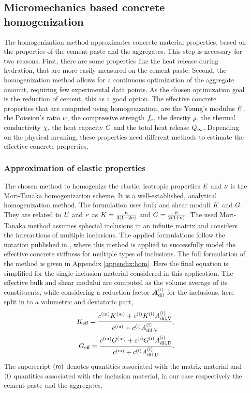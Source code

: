\subsection{Micromechanics based concrete homogenization}
The homogenization method approximates concrete material properties, based on the properties of the cement paste and the aggregates.
This step is necessary for two reasons.
First, there are some properties like the heat release during hydration, that are more easily measured on the cement paste.
Second, the homogenization method allows for a continuous optimization of the aggregate amount, requiring few experimental data points.
As the chosen optimization goal is the reduction of cement, this as a good option.
The effective concrete properties that are computed using homogenization, are the Young's modulus $E$, the Poission's ratio $\nu$, the compressive strength $f_{\text{c}}$, the density $\rho$, the thermal conductivity $\chi$, the heat capacity $C$ and the total heat release $Q_{\infty}$.
Depending on the physical meaning, these properties need different methods to estimate the effective concrete properties.
\subsubsection{Approximation of elastic properties}
The chosen method to homogenize the elastic, isotropic properties $E$ and $\nu$ is the Mori-Tanaka homogenization scheme, \cite{mor_1973_asi}
It is a well-established, analytical homogenization method.
The formulation uses bulk and shear moduli $K$ and $G$.
They are related to $E$ and $\nu$ as $K = \frac{E}{3(1-2\nu)}$ and $G = \frac{E}{2(1+\nu)}$.
The used Mori-Tanaka method assumes sphecial inclusions in an infinite matrix and considers the interactions of multiple inclusions.
The applied formulations follow the notation published in 
\cite{nee_2012_ammf}, where this method is applied to successfully model the effective concrete stiffness for multiple types of inclusions.
The full formulation of the method is given in Appendix \ref{appendix:hom}.
Here the final equation is simplified for the single inclusion material considered in this application.
The effective bulk and shear modului are computed as the volume average of its constituents,  
while considering a reduction factor $\boldsymbol{A}_{\text{dil}}^{(\text{i})}$ for the inclusions, here split in to a volumetric and deviatoric part,
\begin{align}
K_{\text{eff}} = \dfrac{c^{(\text{m})}K^{(\text{m})} + c^{(\text{i})} K^{(\text{i})} A^{(\text{i})}_{\text{dil,V}}}{c^{(\text{m})} +  c^{(\text{i})} A^{(\text{i})}_{\text{dil,V}}}, \\
G_{\text{eff}} = \dfrac{c^{(\text{m})}G^{(\text{m})} +  c^{(\text{i})} G^{(\text{i})} A^{(\text{i})}_{\text{dil,D}}}{c^{(\text{m})} +  c^{(\text{i})} A^{(\text{i})}_{\text{dil,D}}}.
\end{align}
The superscript $(\text{m})$ denotes quantities associated with the matrix material and   $(\text{i})$ quantities associated with the inclusion material, in our case respectively the cement paste and the aggregates.

